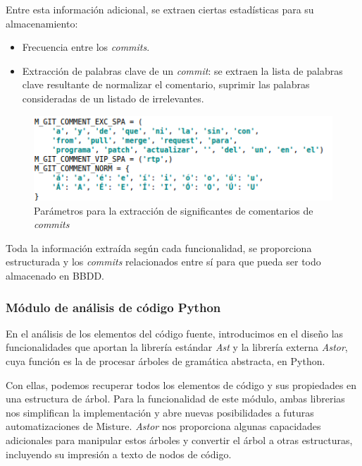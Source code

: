 Entre esta información adicional, se extraen ciertas estadísticas para su almacenamiento:

\begin{itemize}
\item Frecuencia entre los \textit{commits}.

\item Extracción de palabras clave de un \textit{commit}: se extraen la lista de palabras clave resultante de normalizar el comentario, suprimir las palabras consideradas de un listado de irrelevantes.
\end{itemize}

\begin{figure}[H]
   \centering
   \includegraphics[width=16cm]{img/Selection_028_git_comentarios}
   \caption{Parámetros para la extracción de significantes de comentarios de \textit{commits}}
   \label{figura:git_commnet}
\end{figure}

Toda la información extraída según cada funcionalidad, se proporciona estructurada y los \textit{commits} relacionados entre sí para que pueda ser todo almacenado en BBDD.


\subsubsection{Módulo de análisis de código Python} 
\label{subsec:mod_anal_python}

En el análisis de los elementos del código fuente, introducimos en el diseño las funcionalidades que aportan la librería estándar \textit{Ast} y la librería externa \textit{Astor}, cuya función es la de procesar árboles de gramática abstracta, en Python.


Con ellas, podemos recuperar todos los elementos de código y sus propiedades en una estructura de árbol. Para la funcionalidad de este módulo, ambas librerias nos simplifican la implementación y abre nuevas posibilidades a futuras automatizaciones de Misture. \textit{Astor} nos proporciona algunas capacidades adicionales para manipular estos árboles y convertir el árbol a otras estructuras, incluyendo su impresión a texto de nodos de código.


